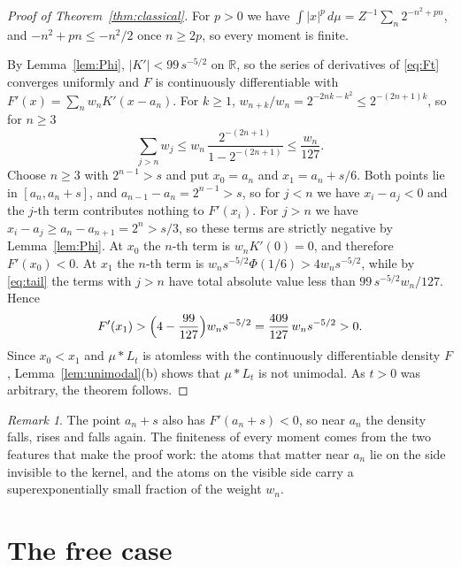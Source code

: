 \documentclass[11pt]{amsart}
\theoremstyle{definition}
\theoremstyle{remark}
\newtheorem{remark}[theorem]{Remark}
\numberwithin{equation}{section}
\newcommand{\R}{\mathbb{R}}
\begin{document}
\begin{proof}[Proof of Theorem~\ref{thm:classical}]
For $p>0$ we have $\int|x|^p\,d\mu=Z^{-1}\sum_n2^{-n^2+pn}$, and $-n^2+pn\le-n^2/2$ once $n\ge2p$, so every moment is finite.

By Lemma~\ref{lem:Phi}, $|K'|<99\,s^{-5/2}$ on $\R$, so the series of derivatives of \eqref{eq:Ft} converges uniformly and $F$ is continuously differentiable with $F'(x)=\sum_nw_nK'(x-a_n)$. For $k\ge1$, $w_{n+k}/w_n=2^{-2nk-k^2}\le2^{-(2n+1)k}$, so for $n\ge3$
\begin{equation}\label{eq:tail}
\sum_{j>n}w_j\le w_n\,\frac{2^{-(2n+1)}}{1-2^{-(2n+1)}}\le\frac{w_n}{127}.
\end{equation}
Choose $n\ge3$ with $2^{n-1}>s$ and put $x_0=a_n$ and $x_1=a_n+s/6$. Both points lie in $[a_n,a_n+s]$, and $a_{n-1}-a_n=2^{n-1}>s$, so for $j<n$ we have $x_i-a_j<0$ and the $j$-th term contributes nothing to $F'(x_i)$. For $j>n$ we have $x_i-a_j\ge a_n-a_{n+1}=2^n>s/3$, so these terms are strictly negative by Lemma~\ref{lem:Phi}. At $x_0$ the $n$-th term is $w_nK'(0)=0$, and therefore $F'(x_0)<0$. At $x_1$ the $n$-th term is $w_ns^{-5/2}\Phi(1/6)>4w_ns^{-5/2}$, while by \eqref{eq:tail} the terms with $j>n$ have total absolute value less than $99\,s^{-5/2}w_n/127$. Hence
\[
F'(x_1)>\Bigl(4-\frac{99}{127}\Bigr)w_ns^{-5/2}=\frac{409}{127}\,w_ns^{-5/2}>0 .
\]
Since $x_0<x_1$ and $\mu*L_t$ is atomless with the continuously differentiable density $F$, Lemma~\ref{lem:unimodal}(b) shows that $\mu*L_t$ is not unimodal. As $t>0$ was arbitrary, the theorem follows.
\end{proof}

\begin{remark}
The point $a_n+s$ also has $F'(a_n+s)<0$, so near $a_n$ the density falls, rises and falls again. The finiteness of every moment comes from the two features that make the proof work: the atoms that matter near $a_n$ lie on the side invisible to the kernel, and the atoms on the visible side carry a superexponentially small fraction of the weight $w_n$.
\end{remark}

\section{The free case}\label{sec:free}
\end{document}
